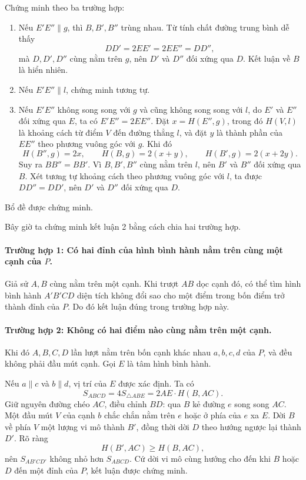 \documentclass[11pt]{article}
\newcommand{\area}[1]{S_{#1}}
\begin{document}
Chứng minh theo ba trường hợp:
\begin{enumerate}
  \item Nếu \(E'E''\parallel g\), thì \(B,B',B''\) trùng nhau. Từ tính chất
  đường trung bình dễ thấy
  \[
    DD'=2EE'=2EE''=DD'',
  \]
  mà \(D,D',D''\) cùng nằm trên \(g\), nên \(D'\) và \(D''\) đối xứng qua
  \(D\). Kết luận về \(B\) là hiển nhiên.

  \item Nếu \(E'E''\parallel l\), chứng minh tương tự.

  \item Nếu \(E'E''\) không song song với \(g\) và cũng không song song với
  \(l\), do \(E'\) và \(E''\) đối xứng qua \(E\), ta có \(E'E''=2EE''\). Đặt
  \(x=H(E'',g)\), trong đó \(H(V,l)\) là khoảng cách từ điểm \(V\) đến đường
  thẳng \(l\), và đặt \(y\) là thành phần của \(EE''\) theo phương vuông góc
  với \(g\). Khi đó
  \[
    H(B'',g)=2x,\qquad H(B,g)=2(x+y),\qquad H(B',g)=2(x+2y).
  \]
  Suy ra \(BB''=BB'\). Vì \(B,B',B''\) cùng nằm trên \(l\), nên \(B'\) và
  \(B''\) đối xứng qua \(B\). Xét tương tự khoảng cách theo phương vuông góc
  với \(l\), ta được \(DD''=DD'\), nên \(D'\) và \(D''\) đối xứng qua \(D\).
\end{enumerate}
Bổ đề được chứng minh.

Bây giờ ta chứng minh kết luận 2 bằng cách chia hai trường hợp.

\paragraph{Trường hợp 1: Có hai đỉnh của hình bình hành nằm trên cùng một cạnh của \(P\).}
Giả sử \(A,B\) cùng nằm trên một cạnh. Khi trượt \(AB\) dọc cạnh đó, có thể
tìm hình bình hành \(A'B'CD\) diện tích không đổi sao cho một điểm trong bốn
điểm trở thành đỉnh của \(P\). Do đó kết luận đúng trong trường hợp này.

\paragraph{Trường hợp 2: Không có hai điểm nào cùng nằm trên một cạnh.}
Khi đó \(A,B,C,D\) lần lượt nằm trên bốn cạnh khác nhau \(a,b,c,d\) của
\(P\), và đều không phải đầu mút cạnh. Gọi \(E\) là tâm hình bình hành.

Nếu \(a\parallel c\) và \(b\parallel d\), vị trí của \(E\) được xác định.
Ta có
\[
  \area{ABCD}=4\area{\triangle ABE}=2AE\cdot H(B,AC).
\]
Giữ nguyên đường chéo \(AC\), điều chỉnh \(BD\): qua \(B\) kẻ đường \(e\)
song song \(AC\). Một đầu mút \(V\) của cạnh \(b\) chắc chắn nằm trên \(e\)
hoặc ở phía của \(e\) xa \(E\). Dời \(B\) về phía \(V\) một lượng vi mô thành
\(B'\), đồng thời dời \(D\) theo hướng ngược lại thành \(D'\). Rõ ràng
\[
  H(B',AC)\ge H(B,AC),
\]
nên \(\area{AB'CD'}\) không nhỏ hơn \(\area{ABCD}\). Cứ dời vi mô cùng hướng
cho đến khi \(B\) hoặc \(D\) đến một đỉnh của \(P\), kết luận được chứng minh.
\end{document}
